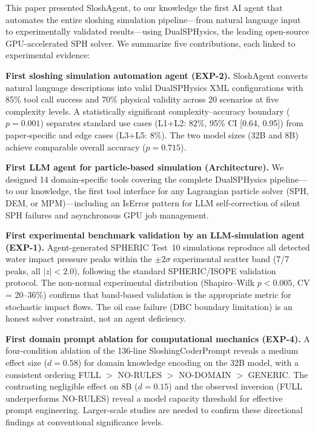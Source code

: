\documentclass[11pt]{article}
\begin{document}
This paper presented SloshAgent, to our knowledge the first AI agent that automates the entire sloshing simulation pipeline---from natural language input to experimentally validated results---using DualSPHysics, the leading open-source GPU-accelerated SPH solver. We summarize five contributions, each linked to experimental evidence:

\textbf{First sloshing simulation automation agent (EXP-2).} SloshAgent converts natural language descriptions into valid DualSPHysics XML configurations with 85\% tool call success and 70\% physical validity across 20 scenarios at five complexity levels. A statistically significant complexity--accuracy boundary ($p = 0.001$) separates standard use cases (L1+L2: 82\%, 95\% CI [0.64, 0.95]) from paper-specific and edge cases (L3+L5: 8\%). The two model sizes (32B and 8B) achieve comparable overall accuracy ($p = 0.715$).

\textbf{First LLM agent for particle-based simulation (Architecture).} We designed 14 domain-specific tools covering the complete DualSPHysics pipeline---to our knowledge, the first tool interface for any Lagrangian particle solver (SPH, DEM, or MPM)---including an IsError pattern for LLM self-correction of silent SPH failures and asynchronous GPU job management.

\textbf{First experimental benchmark validation by an LLM-simulation agent (EXP-1).} Agent-generated SPHERIC Test~10 simulations reproduce all detected water impact pressure peaks within the $\pm 2\sigma$ experimental scatter band (7/7 peaks, all $|z| < 2.0$), following the standard SPHERIC/ISOPE validation protocol. The non-normal experimental distribution (Shapiro--Wilk $p < 0.005$, CV = 20--36\%) confirms that band-based validation is the appropriate metric for stochastic impact flows. The oil case failure (DBC boundary limitation) is an honest solver constraint, not an agent deficiency.

\textbf{First domain prompt ablation for computational mechanics (EXP-4).} A four-condition ablation of the 136-line SloshingCoderPrompt reveals a medium effect size ($d = 0.58$) for domain knowledge encoding on the 32B model, with a consistent ordering FULL $>$ NO-RULES $>$ NO-DOMAIN $>$ GENERIC. The contrasting negligible effect on 8B ($d = 0.15$) and the observed inversion (FULL underperforms NO-RULES) reveal a model capacity threshold for effective prompt engineering. Larger-scale studies are needed to confirm these directional findings at conventional significance levels.
\end{document}
